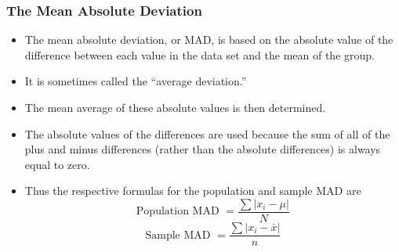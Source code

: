 \documentclass{beamer}
\begin{document}
\begin{frame}
\frametitle{The Mean Absolute Deviation} 
\begin{itemize}
\item The mean absolute deviation, or MAD, is based on the absolute value of the difference between each value
in the data set and the mean of the group. 
\item It is sometimes called the “average deviation.” 
\item The mean average of
these absolute values is then determined. 
\item The absolute values of the differences are used because the sum of all
of the plus and minus differences (rather than the absolute differences) is always equal to zero. 
\item Thus the
respective formulas for the population and sample MAD are
\[ \mbox{Population MAD }= \frac{\sum |x_i - \mu|}{N} \]
\[ \mbox{Sample MAD }= \frac{\sum |x_i - \bar{x}|}{n} \]
\end{itemize}
\end{frame}
\end{document}
